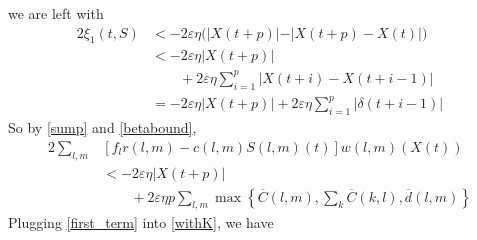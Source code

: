 we are left with
\begin{align} \nonumber
2\xi_1 (t,S) &< -2\varepsilon \eta \big( \vert X(t + p) \vert -  \vert  X(t + p) - X(t)   \vert \big)\\ \nonumber
&< -2\varepsilon \eta   \vert X(t + p) \vert \\  \nonumber
&\qquad + 2\varepsilon \eta\sum_{i=1}^{p} \vert  X(t + i) - X(t + i - 1)   \vert  \\ 
&= -2\varepsilon \eta   \vert X(t + p) \vert + 2\varepsilon \eta\sum_{i=1}^{p} \vert \delta(t + i -1) \vert 
\label{sump}
\end{align}
So by \eqref{sump} and \eqref{betabound}, 
\begin{align}  \label{first_term}
2\sum_{l,m} & [f_{l}r(l,m) - c(l,m)S(l,m)(t) ]w(l,m)(X(t))  \\ \nonumber
&  < -2\varepsilon \eta  \vert X(t + p) \vert \\ \nonumber
& \qquad + 2\varepsilon \eta  p \sum_{l,m} \max\left\{ \overline{C}(l,m),\sum_{k}\overline{C}(k,l),\overline d(l,m) \right\} 
\end{align}
Plugging \eqref{first_term} into \eqref{withK}, we have

